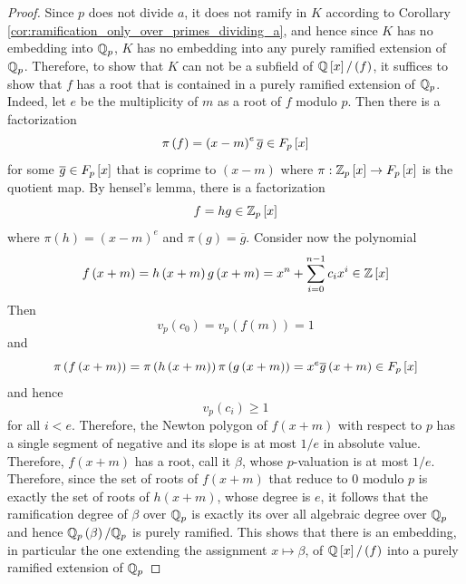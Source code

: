 \documentclass[../main.tex]{subfiles}
\begin{document}
\begin{proof}
  Since $p$ does not divide $a$, it does not ramify in $K$ according to Corollary \ref{cor:ramification_only_over_primes_dividing_a}, and hence since $K$ has no embedding into $\mathbb{Q}_p$, $K$ has no embedding into any purely ramified extension of $\mathbb{Q}_p$.
  Therefore, to show that $K$ can not be a subfield of $\mathbb{Q}\left[ x \right] / \left( f \right)$, it suffices to show that $f$ has a root that is contained in a purely ramified extension of $\mathbb{Q}_p$.
  Indeed, let $e$ be the multiplicity of $m$ as a root of $f$ modulo $p$.
  Then there is a factorization 
    \[
      \pi\left( f \right) = \left( x-m \right)^e \overline{g} \in F_p\left[ x \right]
    \]
    for some $\overline{g} \in F_p\left[ x \right]$ that is coprime to $\left( x-m \right)$ where $\pi : \mathbb{Z}_p\left[ x \right] \to F_p\left[ x \right]$ is the quotient map.
    By hensel's lemma, there is a factorization
    \[
      f = h g \in \mathbb{Z}_p\left[ x \right]
    \]
    where $\pi\left( h \right) = \left( x-m \right)^e$ and $\pi\left( g \right) = \overline{g}$.
    Consider now the polynomial 
    \[
      f\left( x + m \right) = 
      h\left( x + m \right)g\left( x + m \right) = x^n + \sum_{i=0}^{n-1} c_i x^i \in \mathbb{Z}\left[ x \right]  
    \]
    Then 
    \[
      v_p\left( c_0 \right) = v_p\left( f\left( m \right) \right) = 1
    \]
    and 
    \[
      \pi\left( f\left( x + m \right) \right) = 
      \pi\left( h\left( x + m \right) \right) \pi\left( g\left( x + m \right) \right) =
      x^e \overline{g}\left( x + m \right) \in F_p\left[ x \right]
    \]
    and hence 
    \[
      v_p\left( c_i \right) \geq 1
    \]
    for all $i < e$.
    Therefore, the Newton polygon of $f\left( x + m \right)$ with respect to $p$ has a single segment of negative and its slope is at most $1/e$ in absolute value.
    Therefore, $f\left( x + m \right)$ has a root, call it $\beta$, whose $p$-valuation is at most $1/e$.
    Therefore, since the set of roots of $f\left( x + m \right)$ that reduce to $0$ modulo $p$ is exactly the set of roots of $h\left( x + m \right)$, whose degree is $e$, it follows that the ramification degree of $\beta$ over $\mathbb{Q}_p$ is exactly its over all algebraic degree over $\mathbb{Q}_p$ and hence $\mathbb{Q}_p\left( \beta \right) / \mathbb{Q}_p$ is purely ramified.
    This shows that there is an embedding, in particular the one extending the assignment $x \mapsto \beta$, of $\mathbb{Q}\left[ x \right] / \left( f \right)$ into a purely ramified extension of $\mathbb{Q}_p$  
\end{proof}
\end{document}
